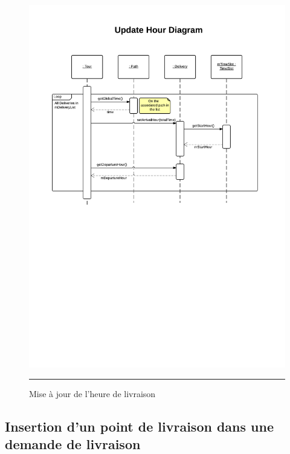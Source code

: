 \begin{figure}[H]
	\centering
		\includegraphics[width=\textwidth,height=\textheight,keepaspectratio, angle=90]{Figures/heure}
		\rule{35em}{0.5pt}
	\caption[Mise à jour de l'heure de livraison]{Mise à jour de l'heure de livraison}
\end{figure}


\subsection{Insertion d'un point de livraison dans une demande de livraison}

